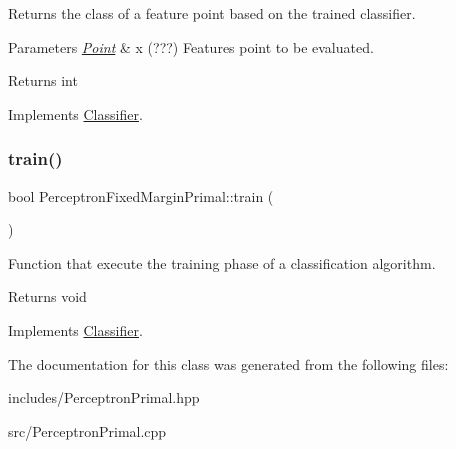 Returns the class of a feature point based on the trained classifier. 


\begin{DoxyParams}{Parameters}
{\em \hyperlink{class_point}{Point}} & x (???) Features point to be evaluated. \\
\hline
\end{DoxyParams}
\begin{DoxyReturn}{Returns}
int 
\end{DoxyReturn}


Implements \hyperlink{class_classifier_ae8e9554823b85ddc2dcad2955da811d9}{Classifier}.

\mbox{\label{class_perceptron_fixed_margin_primal_ad41c2a42c4a819c03bf9879110b0f99f}} 
\subsubsection{\texorpdfstring{train()}{train()}}
{\footnotesize\ttfamily bool Perceptron\+Fixed\+Margin\+Primal\+::train (\begin{DoxyParamCaption}{ }\end{DoxyParamCaption})\hspace{0.3cm}{\ttfamily [virtual]}}



Function that execute the training phase of a classification algorithm. 

\begin{DoxyReturn}{Returns}
void 
\end{DoxyReturn}


Implements \hyperlink{class_classifier_a2306a5de27555ab093593ac9642bc7d9}{Classifier}.



The documentation for this class was generated from the following files\+:\begin{DoxyCompactItemize}
\item 
includes/Perceptron\+Primal.\+hpp\item 
src/Perceptron\+Primal.\+cpp\end{DoxyCompactItemize}
